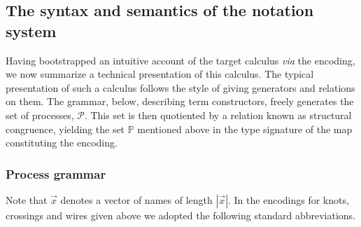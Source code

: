 \subsection{The syntax and semantics of the notation system}\label{sub:the_syntax_and_semantics_of_the_notation_system} %


Having bootstrapped an intuitive account of the target calculus  \emph{via}
the encoding, we now summarize a technical presentation of this calculus. The
typical presentation of such a calculus follows the style of giving
generators and relations on them. The grammar, below, describing term
constructors, freely generates the set of processes,
$\mathcal{P}$. This set is then quotiented by a relation known as
structural congruence, yielding the set $\mathbb {P}$ mentioned above
in the type signature of the map constituting the encoding.

\subsubsection{Process grammar}\label{subsub:process_grammar}



Note that $\vec{x}$ denotes a vector of names of length
$|\vec{x}|$. In the encodings for knots, crossings and wires given above we
adopted the following standard abbreviations.

